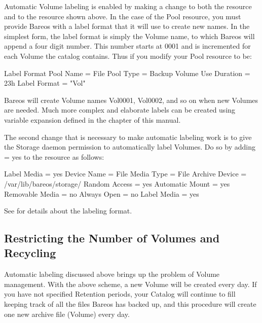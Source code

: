 Automatic Volume labeling is enabled by making a change to both the 
resource and to the  resource shown above.
In the case of the Pool resource, you must provide Bareos with a label format
that it will use to create new names. In the simplest form, the label format
is simply the Volume name, to which Bareos will append a four digit number.
This number starts at 0001 and is incremented for each Volume the catalog
contains. Thus if you modify your Pool resource to be:

\begin{bconfig}{Label Format}
Pool {
  Name = File
  Pool Type = Backup
  Volume Use Duration = 23h
  Label Format = "Vol"
}
\end{bconfig}

Bareos will create Volume names Vol0001, Vol0002, and so on when new Volumes
are needed. Much more complex and elaborate labels can be created using
variable expansion defined in the
 chapter of this manual.

The second change that is necessary to make automatic labeling work is to give
the Storage daemon permission to automatically label Volumes. Do so by adding
 = yes to the  resource as follows:

\begin{bconfig}{Label Media = yes}
Device {
  Name = File
  Media Type = File
  Archive Device = /var/lib/bareos/storage/
  Random Access = yes
  Automatic Mount = yes
  Removable Media = no
  Always Open = no
  Label Media = yes
}
\end{bconfig}

See  for details about the labeling format.


\subsection{Restricting the Number of Volumes and Recycling}

Automatic labeling discussed above brings up the problem of Volume management.
With the above scheme, a new Volume will be created every day. If you have not
specified Retention periods, your Catalog will continue to fill keeping track
of all the files Bareos has backed up, and this procedure will create one new
archive file (Volume) every day.

